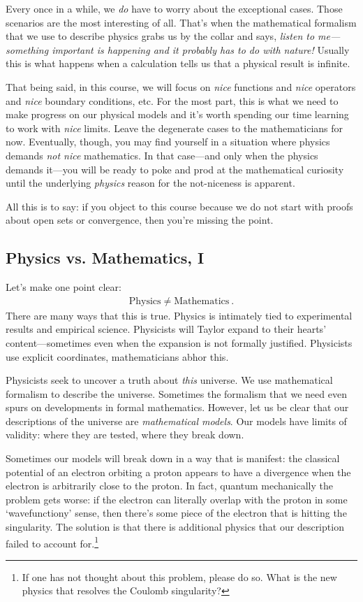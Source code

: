 \documentclass[12pt]{article}
\numberwithin{equation}{section}    %
\begin{document}
Every once in a while, we \emph{do} have to worry about the exceptional cases. Those scenarios are the most interesting of all. That’s when the mathematical formalism that we use to describe physics grabs us by the collar and says, \emph{listen to me---something important is happening and it probably has to do with nature!} Usually this is what happens when a calculation tells us that a physical result is infinite. 

That being said, in this course, we will focus on \emph{nice} functions and \emph{nice} operators and \emph{nice} boundary conditions, etc. For the most part, this is what we need to make progress on our physical models and it’s worth spending our time learning to work with \emph{nice} limits. Leave the degenerate cases to the mathematicians for now. Eventually, though, you may find yourself in a situation where physics demands \emph{not nice} mathematics. In that case---and only when the physics demands it---you will be ready to poke and prod at the mathematical curiosity until the underlying \emph{physics} reason for the not-niceness is apparent.

All this is to say: if you object to this course because we do not start with proofs about open sets or convergence, then you’re missing the point.

\subsection{Physics vs. Mathematics, I}

Let’s make one point clear:
\begin{align}
  \text{Physics} \neq \text{Mathematics} \ .
\end{align}
There are many ways that this is true. Physics is intimately tied to experimental results and empirical science. Physicists will Taylor expand to their hearts’ content---sometimes even when the expansion is not formally justified. Physicists use explicit coordinates, mathematicians abhor this. 

Physicists seek to uncover a truth about \emph{this} universe. We use mathematical formalism to describe the universe. Sometimes the formalism that we need even spurs on developments in formal mathematics. However, let us be clear that our descriptions of the universe are \emph{mathematical models}. Our models have limits of validity: where they are tested, where they break down. 

Sometimes our models will break down in a way that is manifest: the classical potential of an electron orbiting a proton appears to have a divergence when the electron is arbitrarily close to the proton. In fact, quantum mechanically the problem gets worse: if the electron can literally overlap with the proton in some `wavefunctiony’ sense, then there’s some piece of the electron that is hitting the singularity. The solution is that there is additional physics that our description failed to account for.\footnote{If one has not thought about this problem, please do so. What is the new physics that resolves the Coulomb singularity?} 
\end{document}
